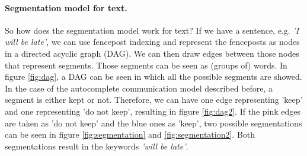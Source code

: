 \paragraph{Segmentation model for text.}
So how does the segmentation model work for text? 
If we have a sentence, e.g. \textit{'I will be late'}, we can use fencepost indexing and represent the fenceposts as nodes in a directed acyclic graph (DAG). 
We can then draw edges between those nodes that represent segments. 
Those segments can be seen as (groups of) words. 
In figure \ref{fig:dag}, a DAG can be seen in which all the possible segments are showed. 
In the case of the autocomplete communication model described before, a segment is either kept or not.
Therefore, we can have one edge representing 'keep' and one representing 'do not keep', resulting in figure \ref{fig:dag2}.
If the pink edges are taken as 'do not keep' and the blue ones as 'keep', two possible segmentations can be seen in figure \ref{fig:segmentation} and \ref{fig:segmentation2}. 
Both segmentations result in the keywords \textit{'will be late'}. 

